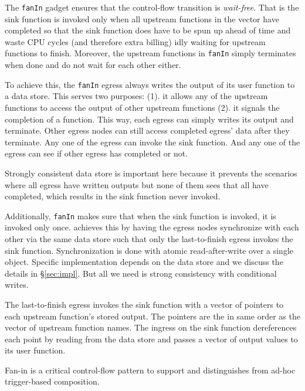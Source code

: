 The \texttt{fanIn} gadget ensures that the control-flow transition is
\emph{wait-free}. That is the sink function is invoked only when all upstream
functions in the vector have completed so that the sink function does have to
be spun up ahead of time and waste CPU cycles (and therefore extra billing)
idly waiting for upstream functions to finish. Moreover, the upstream
functions in \texttt{fanIn} simply terminates when done and do not wait for
each other either.

To achieve this, the \texttt{fanIn} egress always writes the output of its
user function to a data store. This serves two purposes: (1). it allows any of
the upstream functions to access the output of other upstream functions (2).
it signals the completion of a function. This way, each egress can simply
writes its output and terminate. Other egress nodes can still access completed
egress' data after they terminate. Any one of the egress can invoke the sink
function. And any one of the egress can see if other egress has completed or
not. 

Strongly consistent data store is important here because it prevents the
scenarios where all egress have written outputs but none of them sees that all
have completed, which results in the sink function never invoked.

Additionally, \texttt{fanIn} makes sure that when the sink function is
invoked, it is invoked only once. \name{} achieves this by having the egress
nodes synchronize with each other via the same data store such that only the
last-to-finish egress invokes the sink function. Synchronization is done with
atomic read-after-write over a single object. Specific implementation depends
on the data store and we discuss the details in \S\ref{sec:impl}. But all we
need is strong consistency with conditional writes.

The last-to-finish egress invokes the sink function with a vector of pointers
to each upstream function's stored output. The pointers are the in same order
as the vector of upstream function names. The ingress on the sink function
dereferences each point by reading from the data store and passes a vector of
output values to its user function.

Fan-in is a critical control-flow pattern to support and distinguishes \name{}
from ad-hoc trigger-based composition. 




